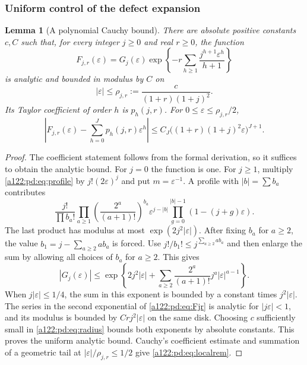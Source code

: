 \documentclass[11pt,letterpaper]{article}
\numberwithin{equation}{subsection}
\newtheorem{lemma}[theorem]{Lemma}
\theoremstyle{definition}
\theoremstyle{remark}
\theoremstyle{plain}
\begin{document}
\subsubsection{Uniform control of the defect expansion}
\begin{lemma}[A polynomial Cauchy bound]\label{a122:pd:lem:Cauchy}
There are absolute positive constants $c,C$ such that, for every integer
$j\ge0$ and real $r\ge0$, the function
\begin{equation}\label{a122:pd:eq:Fjr}
 F_{j,r}(\varepsilon)=G_j(\varepsilon)
 \exp\!\left\{-r\sum_{h\ge1}
       \frac{j^{h+1}\varepsilon^h}{h+1}\right\}
\end{equation}
is analytic and bounded in modulus by $C$ on
\begin{equation}\label{a122:pd:eq:radius}
 |\varepsilon|\le\rho_{j,r}:=
 \frac{c}{(1+r)(1+j)^2}.
\end{equation}
Its Taylor coefficient of order $h$ is $p_h(j,r)$.
For $0\le\varepsilon\le\rho_{j,r}/2$,
\begin{equation}\label{a122:pd:eq:localrem}
 \left|F_{j,r}(\varepsilon)-\sum_{h=0}^J
 p_h(j,r)\varepsilon^h\right|
 \le C_J\big((1+r)(1+j)^2\varepsilon\big)^{J+1}.
\end{equation}
\end{lemma}
\begin{proof}
The coefficient statement follows from the formal derivation, so it
suffices to obtain the analytic bound. For $j=0$ the function is one.
For $j\ge1$, multiply \eqref{a122:pd:eq:profile} by
$j!(2\varepsilon)^j$ and put $m=\varepsilon^{-1}$.
A profile with $|b|=\sum b_a$ contributes
\[
 \frac{j!}{\prod b_a!}
 \prod_{a\ge1}\left(\frac{2^a}{(a+1)!}\right)^{b_a}
 \varepsilon^{j-|b|}
 \prod_{g=0}^{|b|-1}(1-(j+g)\varepsilon).
\]
The last product has modulus at most $\exp(2j^2|\varepsilon|)$.
After fixing $b_a$ for $a\ge2$, the value
$b_1=j-\sum_{a\ge2}a b_a$ is forced. Use
$j!/b_1!\le j^{\sum_{a\ge2}a b_a}$ and then enlarge the sum by
allowing all choices of $b_a$ for $a\ge2$. This gives
\begin{equation}\label{a122:pd:eq:Gbound}
 |G_j(\varepsilon)|\le
 \exp\!\left\{2j^2|\varepsilon|+
 \sum_{a\ge2}\frac{2^a}{(a+1)!}
           j^a|\varepsilon|^{a-1}\right\}.
\end{equation}
When $j|\varepsilon|\le1/4$, the sum in this exponent is bounded
by a constant times $j^2|\varepsilon|$.
The series in the second exponential of \eqref{a122:pd:eq:Fjr} is analytic
for $|j\varepsilon|<1$, and its modulus is bounded by
$C r j^2|\varepsilon|$ on the same disk.
Choosing $c$ sufficiently small in \eqref{a122:pd:eq:radius} bounds both
exponents by absolute constants. This proves the uniform analytic bound.
Cauchy's coefficient estimate and summation of a geometric tail at
$|\varepsilon|/\rho_{j,r}\le1/2$ give \eqref{a122:pd:eq:localrem}.
\end{proof}
\end{document}
